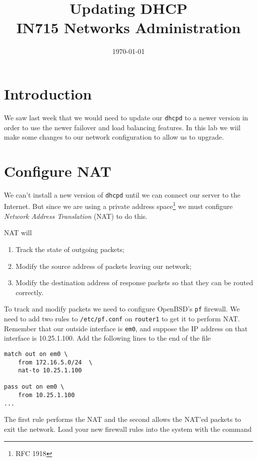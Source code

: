 \documentclass{article}
\begin{document}
\title{ Updating DHCP \\ IN715 Networks Administration}
\date{\today}
\maketitle

\section*{Introduction}
We saw last week that we would need to update our \texttt{dhcpd} to a newer version in order to use the newer failover and load balancing features.  In this lab we wiil make some changes to our network configuration to allow us to upgrade.

\section{Configure NAT}
We can't install a new version of \texttt{dhcpd} until we can connect our server to the Internet.  But since we are using a private address space\footnote{RFC 1918} we must configure \emph{Network Address Translation} (NAT) to do this.

NAT will

\begin{enumerate}
	\item Track the state of outgoing packets;
	\item Modify the source address of packets leaving our network;
	\item Modify the destination address of response packets so that they can be routed correctly. 
\end{enumerate}

To track and modify packets we need to configure OpenBSD's \texttt{pf} firewall.  We need to add two rules to \texttt{/etc/pf.conf} on \texttt{router1} to get it to perform NAT.  Remember that our outside interface is \texttt{em0}, and suppose the IP address on that interface is 10.25.1.100.  Add the following lines to the end of the file

\begin{verbatim}
match out on em0 \
    from 172.16.5.0/24  \
    nat-to 10.25.1.100

pass out on em0 \
    from 10.25.1.100
...
\end{verbatim}

The first rule performs the NAT and the second allows the NAT'ed packets to exit the network.  Load your new firewall rules into the system with the command
\end{document}
